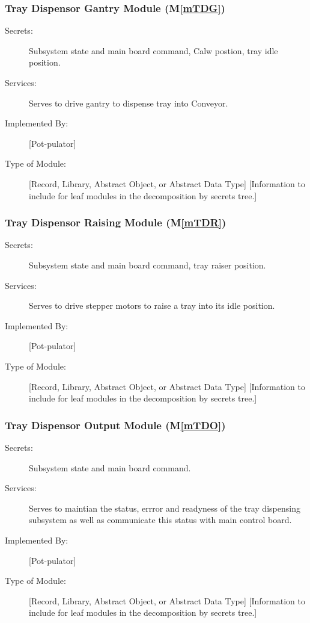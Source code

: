 \documentclass[12pt, titlepage]{article}
\newcommand{\mref}[1]{M\ref{#1}}
\begin{document}
\subsubsection{Tray Dispensor Gantry Module (\mref{mTDG})}
\begin{description}
\item[Secrets:] Subsystem state and main board command, Calw postion, tray idle position.
\item[Services:] Serves to drive gantry to dispense tray into Conveyor.
\item[Implemented By:] [Pot-pulator]
\item[Type of Module:] [Record, Library, Abstract Object, or Abstract Data Type]
  [Information to include for leaf modules in the decomposition by secrets tree.]
\end{description}

\subsubsection{Tray Dispensor Raising Module (\mref{mTDR})}
\begin{description}
\item[Secrets:] Subsystem state and main board command, tray raiser position.
\item[Services:] Serves to drive stepper motors to raise a tray into its idle position.
\item[Implemented By:] [Pot-pulator]
\item[Type of Module:] [Record, Library, Abstract Object, or Abstract Data Type]
  [Information to include for leaf modules in the decomposition by secrets tree.]
\end{description}

\subsubsection{Tray Dispensor Output Module (\mref{mTDO})}
\begin{description}
\item[Secrets:] Subsystem state and main board command.
\item[Services:] Serves to maintian the status, errror and readyness of the tray dispensing subsystem as well as
communicate this status with main control board.
\item[Implemented By:] [Pot-pulator]
\item[Type of Module:] [Record, Library, Abstract Object, or Abstract Data Type]
  [Information to include for leaf modules in the decomposition by secrets tree.]
\end{description}
\end{document}
